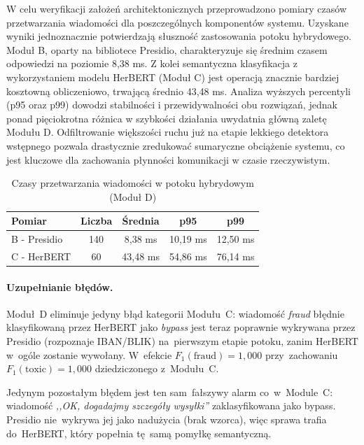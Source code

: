 W celu weryfikacji założeń architektonicznych przeprowadzono pomiary czasów przetwarzania wiadomości dla poszczególnych komponentów systemu. Uzyskane wyniki jednoznacznie potwierdzają słuszność zastosowania potoku hybrydowego. Moduł B, oparty na bibliotece Presidio, charakteryzuje się średnim czasem odpowiedzi na poziomie 8,38 ms. Z kolei semantyczna klasyfikacja z wykorzystaniem modelu HerBERT (Moduł C) jest operacją znacznie bardziej kosztowną obliczeniowo, trwającą średnio 43,48 ms. Analiza wyższych percentyli (p95 oraz p99) dowodzi stabilności i przewidywalności obu rozwiązań, jednak ponad pięciokrotna różnica w szybkości działania uwydatnia główną zaletę Modułu D. Odfiltrowanie większości ruchu już na etapie lekkiego detektora wstępnego pozwala drastycznie zredukować sumaryczne obciążenie systemu, co jest kluczowe dla zachowania płynności komunikacji w czasie rzeczywistym.
\begin{table}[htbp]
\centering
\caption{Czasy przetwarzania wiadomości w potoku hybrydowym (Moduł D)}
\label{tab:wydajnosc_potoku}
\begin{tabular}{lcccc}
\toprule
\textbf{Pomiar} & \textbf{Liczba} & \textbf{Średnia} & \textbf{p95} & \textbf{p99} \\
\midrule
B - Presidio & 140 & 8,38 ms & 10,19 ms & 12,50 ms \\
C - HerBERT  & 60  & 43,48 ms & 54,86 ms & 76,14 ms \\
\bottomrule
\end{tabular}
\end{table}

\paragraph{Uzupełnianie błędów.}
Moduł~D eliminuje jedyny błąd kategorii Modułu~C: wiadomość \textit{fraud}
błędnie klasyfikowaną przez HerBERT jako \textit{bypass} jest teraz poprawnie
wykrywana przez Presidio (rozpoznaje IBAN/BLIK) na~pierwszym etapie potoku,
zanim HerBERT w~ogóle zostanie wywołany. W~efekcie $F_1(\text{fraud}) = 1{,}000$
przy~zachowaniu $F_1(\text{toxic}) = 1{,}000$ dziedziczonego z~Modułu~C.

Jedynym pozostałym błędem jest ten sam~fałszywy alarm co~w~Module~C: wiadomość
\textit{,,OK, dogadajmy szczegóły wysyłki''} zaklasyfikowana jako bypass.
Presidio nie~wykrywa jej jako nadużycia (brak wzorca), więc sprawa trafia
do~HerBERT, który popełnia tę~samą pomyłkę semantyczną.

